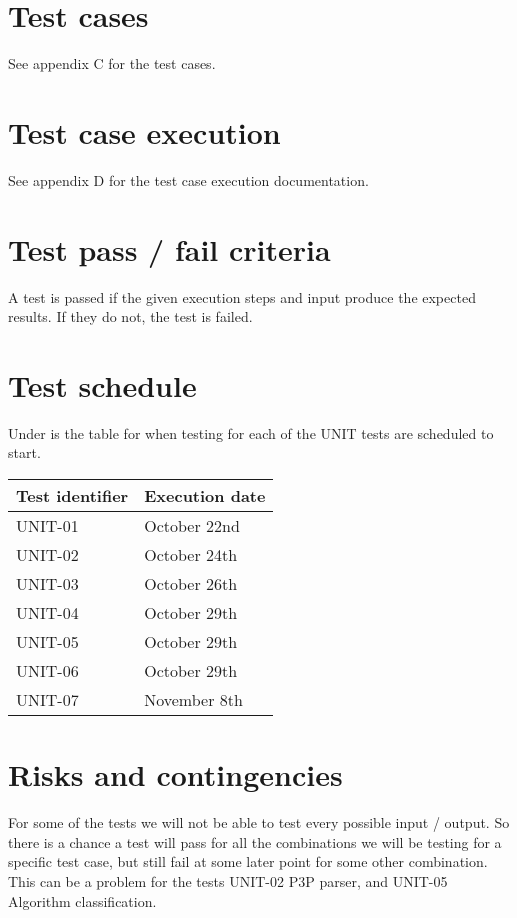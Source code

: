 	\section{Test cases}
		See appendix C for the test cases.

	\section{Test case execution}
		See appendix D for the test case execution documentation.

	\section{Test pass / fail criteria}
		A test is passed if the given execution steps and input produce the expected results. If they do not, the test is failed.

	\section {Test schedule}
		Under is the table for when testing for each of the UNIT tests are scheduled to start.

		\begin{center}
			\begin{tabular}{ |  p{5cm} | p{5cm} | }
				\hline
				Test identifier & Execution date \\ [3pt] \hline \hline
				UNIT-01 & October 22nd \\  [3pt] \hline
				UNIT-02 & October 24th \\  [3pt] \hline
				UNIT-03 & October 26th \\  [3pt] \hline
				UNIT-04 & October 29th \\  [3pt] \hline
				UNIT-05 & October 29th \\  [3pt] \hline
				UNIT-06 & October 29th \\  [3pt] \hline
				UNIT-07 & November 8th \\  [3pt] \hline
			\end{tabular}
		\end{center}

\section{Risks and contingencies}
For some of the tests we will not be able to test every possible input / output. So there is a chance a test will pass for all the combinations we will be testing for a specific test case, but still fail at some later point for some other combination. This can be a problem for the tests UNIT-02 P3P parser, and UNIT-05 Algorithm classification.

